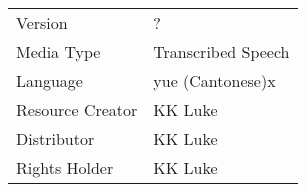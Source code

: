 \documentclass[a4paper,landscape,headrule,footrule,dvips]{foils}
\renewcommand{\cite}{\bibentry}
\begin{document}
\begin{CJK}{UTF8}{min}
{\begin{tabular}{lp{}}
Version &  ?  \\
Media Type &  Transcribed Speech \\
Language &  yue (Cantonese)x \\
Resource Creator &  KK Luke \\
Distributor &  KK Luke \\
Rights Holder &  KK Luke
\end{tabular}}








\clearpage
\end{CJK}
\end{document}
